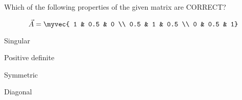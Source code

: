 \item Which of the following properties of the given matrix are CORRECT?

\hfill{}
	$$\vec{A} =\myvec{
1 & 0.5 & 0 \\
0.5 & 1 & 0.5 \\
0 & 0.5 & 1}$$
\begin{enumerate}
\begin{multicols}{4}
\item Singular
\item Positive definite
\item Symmetric
\item Diagonal
\end{multicols}
\end{enumerate}

